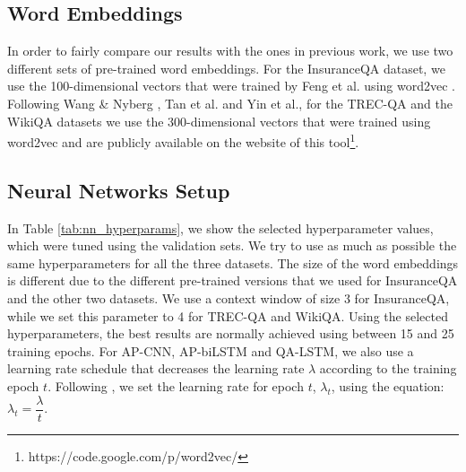 \documentclass{article}
\begin{document}
\subsection{Word Embeddings}
In order to fairly compare our results with the ones in previous work,
we use two different sets of pre-trained word embeddings.
For the InsuranceQA dataset,
we use the 100-dimensional vectors that were trained by Feng et al.  using word2vec \cite{word2vec2013}.
Following Wang \& Nyberg ,
Tan et al.  and Yin et al.,
for the TREC-QA and the WikiQA datasets we use the 300-dimensional vectors that were trained using word2vec and are publicly available on the website of this tool\footnote{https://code.google.com/p/word2vec/}.

\subsection{Neural Networks Setup}
In Table \ref{tab:nn_hyperparams}, 
we show the selected hyperparameter values, 
which were tuned using the validation sets.
We try to use as much as possible the same hyperparameters for all the three datasets.
The size of the word embeddings is different due to the different pre-trained versions that we used for InsuranceQA and the other two datasets.
We use a context window of size 3 for InsuranceQA,
while we set this parameter to 4 for TREC-QA and WikiQA.
Using the selected hyperparameters,
the best results are normally achieved using between 15 and 25 training epochs.
For AP-CNN,
AP-biLSTM and QA-LSTM,
we also use a learning rate schedule that decreases the learning rate $\lambda$ according to the training epoch $t$.
Following \citet{santos2014},
we set the learning rate for epoch $t$, 
$\lambda_t$, 
using the equation:
$\lambda_t = \dfrac{\lambda}{t}$.
\end{document}
